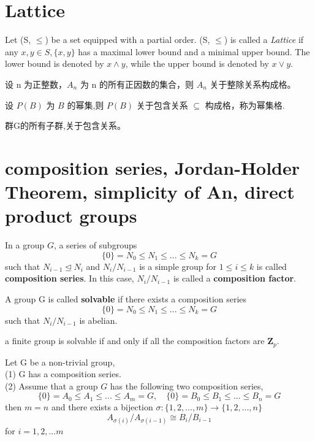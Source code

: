 \documentclass[11pt,fleqn]{book} %
\begin{document}
\begin{CJK}{UTF8}{gkai}
\section{Lattice}
\begin{definition}
	Let (S, $\leq$) be a set equipped with a partial order. (S, $\leq$) is called a {\it Lattice} if any $x, y \in S, \{x, y\}$ has a maximal lower bound and a minimal upper bound.  
	The lower bound is denoted by $x \wedge y$, while the upper bound is denoted by $x \vee y$.
\end{definition}

\begin{example}
	设 n 为正整数，$A_n$ 为 n 的所有正因数的集合，则 $A_n$ 关于整除关系构成格。
\end{example}
\begin{example}
	设 $P(B)$ 为 $B$ 的幂集,则 $P(B)$ 关于包含关系 $\subseteq$ 构成格，称为幂集格.
\end{example}

\begin{example}
	[子群格] 群G的所有子群,关于包含关系。
\end{example}

\section{composition series, Jordan-Holder Theorem, simplicity of An, direct product groups}
\begin{definition}
	 In a group $G$, a series of subgroups 
	\[\{0\} = N_0 \leq N_1 \leq ... \leq N_k = G\]	
	such that $N_{i-1} \unlhd N_i$ and $N_i / N_{i-1}$ is a simple group for $1 \leq i \leq k$ is called {\bf composition series}. In this case, $N_i / N_{i-1}$ is called a {\bf composition factor}.
\end{definition}

\begin{definition}
	[solvable] A group G is called {\bf solvable} if there exists a composition series 
	\[\{0\} = N_0 \leq N_1 \leq ... \leq N_k = G\] 
	such that $N_i / N_{i-1}$ is abelian.
\end{definition}

\begin{corollary}
	a finite group is solvable if and only if all the composition factors are $\mathbf{Z}_p$.
\end{corollary}

\begin{theorem}
	 Let G be a non-trivial group, \\ 
	(1) G has a composition series. \\(2) Assume that a group $G$ has the following two composition series, 
	\[\{0\} = A_0 \leq A_1 \leq ... \leq A_m = G, \quad \{0\} = B_0 \leq B_1 \leq ... \leq B_n = G\]
	then $m = n$ and there exists a bijection $\sigma:\{1,2,...,m\}\to \{1,2,...,n\}$
	\[A_{\sigma(i)} / A_{\sigma(i-1)} \cong B_i / B_{i-1}\]
	for $i = 1, 2, ... m$
\end{theorem}


\end{CJK}
\end{document}
